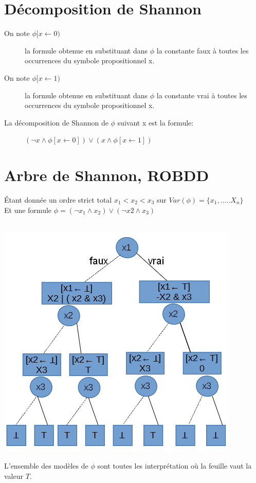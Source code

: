 \section{Décomposition de Shannon}
\begin{description}
\item[On note $\phi [x \leftarrow 0 ) $ ] la formule obtenue en substituant dans $\phi$ la constante faux à toutes les occurrences du symbole propositionnel x.
\item[On note $\phi [x \leftarrow 1 ) $ ] la formule obtenue en substituant dans $\phi$ la constante vrai à toutes les occurrences du symbole propositionnel x.
\end{description}

La décomposition de Shannon de $\phi$ suivant x est la formule:
\begin{description}
\item[] $(\neg x \wedge \phi [x \leftarrow 0]) \vee (x \wedge \phi [x \leftarrow 1])$
\end{description}

\section{Arbre de Shannon, ROBDD}
Étant donnée un ordre strict total $x_1 < x_2 < x_3$ sur $Var(\phi ) = \{x_1, ..... X_n\}$\\
Et une formule $\phi = (\neg x_1 \wedge x_2) \vee ( \neg x2 \wedge x_3)$\\\
\begin{center}
\includegraphics[scale=0.4]{img/of-arbre-shannon_1.png} \\
\end{center}
L'ensemble des modèles de $\phi$ sont toutes les interprétation où la feuille vaut la valeur $T$.

